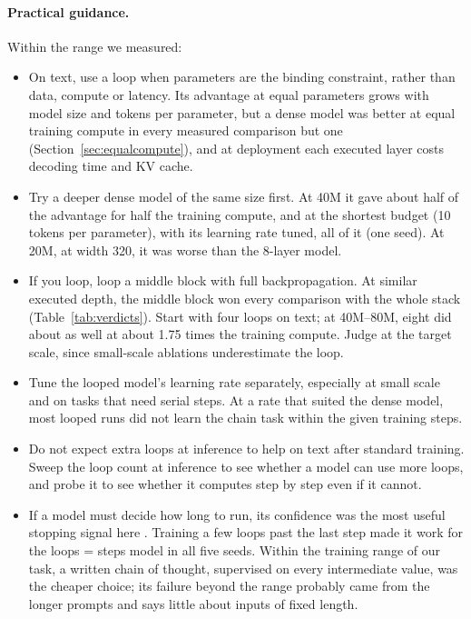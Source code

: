 \paragraph{Practical guidance.} Within the range we measured:
\begin{itemize}
  \item On text, use a loop when parameters are the binding constraint, rather than data, compute or latency. Its
  advantage at equal parameters grows with model size and tokens per parameter, but a dense model was better at equal
  training compute in every measured comparison but one (Section~\ref{sec:equalcompute}), and at deployment each
  executed layer costs decoding time and KV cache.
  \item Try a deeper dense model of the same size first. At 40M it gave about half of the advantage for half the
  training compute, and at the shortest budget (10 tokens per parameter), with its learning rate tuned, all of it (one
  seed). At 20M, at width 320, it was worse than the 8-layer model.
  \item If you loop, loop a middle block with full backpropagation. At similar executed depth, the middle block won
  every comparison with the whole stack (Table~\ref{tab:verdicts}). Start with four loops on text; at 40M--80M, eight did
  about as well at about 1.75 times the training compute. Judge at the target scale, since small-scale ablations
  underestimate the loop.
  \item Tune the looped model's learning rate separately, especially at small scale and on tasks that need serial steps.
  At a rate that suited the dense model, most looped runs did not learn the chain task within the given training steps.
  \item Do not expect extra loops at inference to help on text after standard training. Sweep the loop count at
  inference to see whether a model can use more loops, and probe it to see whether it computes step by step even if it
  cannot.
  \item If a model must decide how long to run, its confidence was the most useful stopping signal here
  . Training a few loops past the last step made it work for the loops = steps model in all five
  seeds. Within the training range of our task, a written chain of thought, supervised on every intermediate value, was
  the cheaper choice; its failure beyond the range probably came from the longer prompts and says little about inputs of
  fixed length.
\end{itemize}
